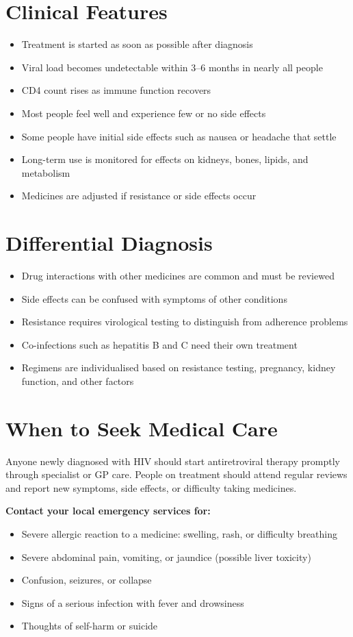 \section*{Clinical Features}
\begin{itemize}
    \item Treatment is started as soon as possible after diagnosis
    \item Viral load becomes undetectable within 3--6 months in nearly all people
    \item CD4 count rises as immune function recovers
    \item Most people feel well and experience few or no side effects
    \item Some people have initial side effects such as nausea or headache that settle
    \item Long-term use is monitored for effects on kidneys, bones, lipids, and metabolism
    \item Medicines are adjusted if resistance or side effects occur
\end{itemize}

\section*{Differential Diagnosis}
\begin{itemize}
    \item Drug interactions with other medicines are common and must be reviewed
    \item Side effects can be confused with symptoms of other conditions
    \item Resistance requires virological testing to distinguish from adherence problems
    \item Co-infections such as hepatitis B and C need their own treatment
    \item Regimens are individualised based on resistance testing, pregnancy, kidney function, and other factors
\end{itemize}

\section*{When to Seek Medical Care}
Anyone newly diagnosed with HIV should start antiretroviral therapy promptly through specialist or GP care. People on treatment should attend regular reviews and report new symptoms, side effects, or difficulty taking medicines.

\textbf{Contact your local emergency services for:}
\begin{itemize}
    \item Severe allergic reaction to a medicine: swelling, rash, or difficulty breathing
    \item Severe abdominal pain, vomiting, or jaundice (possible liver toxicity)
    \item Confusion, seizures, or collapse
    \item Signs of a serious infection with fever and drowsiness
    \item Thoughts of self-harm or suicide
\end{itemize}

